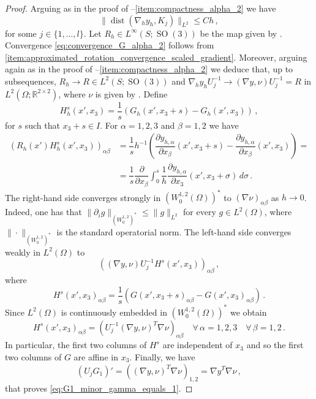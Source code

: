\documentclass{article}
\theoremstyle{plain}
\theoremstyle{plain}
\theoremstyle{plain}
\theoremstyle{plain}
\theoremstyle{plain}
\theoremstyle{definition}
\theoremstyle{definition}
\renewcommand{\r}{\mathbb{R}}
\newcommand{\dpartial}[2]{\dfrac{\partial#1}{\partial#2}}
\DeclareMathOperator{\SO}{SO}
\DeclareMathOperator{\dist}{dist}
\begin{document}
\begin{proof}
    Arguing as in the proof of --\ref{item:compactness_alpha_2} we have 
    \[
        \|\dist(\nabla_h y_h, K_{j})\|_{L^2} \leq Ch \,,
    \]
    for some $j \in \{1, \dots, l\}$. Let $R_h \in L^\infty(S; \SO(3))$ be the map given by . Convergence \eqref{eq:convergence_G_alpha_2} follows from \ref{item:approximated_rotation_convergence_scaled_gradient}. Moreover, arguing again as in the proof of --\ref{item:compactness_alpha_2} we deduce that, up to subsequences, $R_h \to R \in L^2(S; \SO(3))$ and $\nabla_h y_h U_j^{-1} \to (\nabla y, \nu)U_j^{-1} = R$ in $L^2(\Omega; \r^{2 \times 2})$, where $\nu$ is given by . Define
    \[
        H^s_h(x', x_3) = \dfrac{1}{s}(G_h(x',x_3+s) - G_h(x', x_3)) \,,
    \]
    for $s$ such that $x_3 + s \in I$. For $\alpha = 1, 2, 3$ and $\beta = 1, 2$ we have
    \begin{align}
        {(R_h(x') H_h^s(x', x_3))}_{\alpha \beta} &= \dfrac{1}{s}h^{-1}\left(\dpartial{y_{h, \alpha}}{x_\beta}(x', x_3 + s) - \dpartial{y_{h, \alpha}}{x_\beta}(x', x_3)\right) = \nonumber \\
        & = \dfrac{1}{s}\dpartial{}{x_\beta} \int_0^s \dfrac{1}{h} \dpartial{y_{h, \alpha}}{x_3}(x', x_3 + \sigma) \, d\sigma\,. \label{eq:integral_form_affinity}
    \end{align}
    The right-hand side converges strongly in $(W^{1,2}_0(\Omega))^\ast$ to $(\nabla \nu)_{\alpha \beta}$ as $h \to 0$.
    Indeed, one has that $ \|\partial_{i}g\|_{(W^{1,2}_{0})^{\ast}} \leq \|g\|_{L^{2}} $ for every $ g \in L^{2}(\Omega) $, where $ \|\cdot\|_{(W_{0}^{1, 2})^{\ast}} $ is the standard operatorial norm.
    The left-hand side converges weakly in $L^2(\Omega)$ to
    \begin{equation}
        {((\nabla y, \nu) U_j^{-1} H^s(x', x_3))}_{\alpha \beta} \,,
    \end{equation}
    where
    \begin{equation}
        {H^s(x', x_3)}_{\alpha \beta} = \dfrac{1}{s}({G(x', x_3+s)}_{\alpha \beta} - {G(x', x_3)}_{\alpha \beta}) \,.
    \end{equation}
    Since $L^2(\Omega)$ is continuously embedded in $(W^{1,2}_0(\Omega))^\ast$ we obtain 
    \[
        {H^s(x', x_3)}_{\alpha \beta} = {(U_j^{-1}(\nabla y, \nu)^T \nabla \nu)}_{\alpha \beta} \quad \forall \, \alpha =1, 2, 3 \quad \forall \, \beta = 1, 2 \,.
    \]
    In particular, the first two columns of $H^s$ are independent of $x_3$ and so the first two columns of $G$ are affine in $x_3$. Finally, we have
    \[
        (U_j G_1)' = ((\nabla y, \nu)^T \nabla \nu)_{1, 2} = \nabla y^T \nabla \nu \,,
    \]
    that proves \eqref{eq:G1_minor_gamma_equals_1}.
\end{proof}
\end{document}
